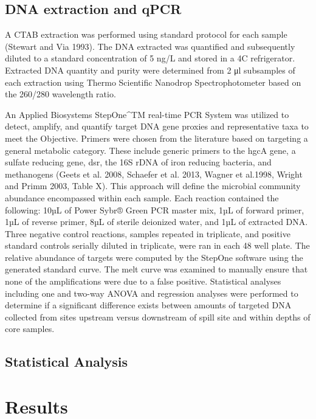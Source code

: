 \documentclass[ms]{uncgdissertationexp}
\theoremstyle{plain}
\theoremstyle{definition}
\theoremstyle{remark}
\begin{document}
  \subsection{DNA extraction and qPCR}\label{dna-extraction-and-qpcr}
  
  A CTAB extraction was performed using standard protocol for each sample
  (Stewart and Via 1993). The DNA extracted was quantified and
  subsequently diluted to a standard concentration of 5 ng/L and stored in
  a 4C refrigerator. Extracted DNA quantity and purity were determined
  from 2 μl subsamples of each extraction using Thermo Scientific Nanodrop
  Spectrophotometer based on the 260/280 wavelength ratio.
  
  An Applied Biosystems StepOne\^{}TM real-time PCR System was utilized to
  detect, amplify, and quantify target DNA gene proxies and representative
  taxa to meet the Objective. Primers were chosen from the literature
  based on targeting a general metabolic category. These include generic
  primers to the hgcA gene, a sulfate reducing gene, dsr, the 16S rDNA of
  iron reducing bacteria, and methanogens (Geets et al. 2008, Schaefer et
  al. 2013, Wagner et al.1998, Wright and Primm 2003, Table X). This
  approach will define the microbial community abundance encompassed
  within each sample. Each reaction contained the following: 10µL of Power
  Sybr® Green PCR master mix, 1µL of forward primer, 1µL of reverse
  primer, 8µL of sterile deionized water, and 1µL of extracted DNA. Three
  negative control reactions, samples repeated in triplicate, and positive
  standard controls serially diluted in triplicate, were ran in each 48
  well plate. The relative abundance of targets were computed by the
  StepOne software using the generated standard curve. The melt curve was
  examined to manually ensure that none of the amplifications were due to
  a false positive. Statistical analyses including one and two-way ANOVA
  and regression analyses were performed to determine if a significant
  difference exists between amounts of targeted DNA collected from sites
  upstream versus downstream of spill site and within depths of core
  samples.
  
  \subsection{Statistical Analysis}\label{statistical-analysis}
  
  \section{Results}\label{results}
  
\end{document}
